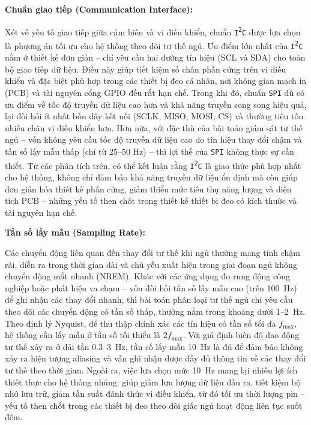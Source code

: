 \textbf{Chuẩn giao tiếp (Communication Interface):}

Xét về yếu tố giao tiếp giữa cảm biến và vi điều khiển, chuẩn \texttt{I\textsuperscript{2}C} được lựa chọn là phương án tối ưu cho hệ thống theo dõi tư thế ngủ. Ưu điểm lớn nhất của \texttt{I\textsuperscript{2}C} nằm ở thiết kế đơn giản – chỉ yêu cầu hai đường tín hiệu (SCL và SDA) cho toàn bộ giao tiếp dữ liệu. Điều này giúp tiết kiệm số chân phần cứng trên vi điều khiển và đặc biệt phù hợp trong các thiết bị đeo cá nhân, nơi không gian mạch in (PCB) và tài nguyên cổng GPIO đều rất hạn chế.
Trong khi đó, chuẩn \texttt{SPI} dù có ưu điểm về tốc độ truyền dữ liệu cao hơn và khả năng truyền song song hiệu quả, lại đòi hỏi ít nhất bốn dây kết nối (SCLK, MISO, MOSI, CS) và thường tiêu tốn nhiều chân vi điều khiển hơn. Hơn nữa, với đặc thù của bài toán giám sát tư thế ngủ – vốn không yêu cầu tốc độ truyền dữ liệu cao do tín hiệu thay đổi chậm và tần số lấy mẫu thấp (chỉ từ 25–50 Hz) – thì lợi thế của \texttt{SPI} không thực sự cần thiết.
Từ các phân tích trên, có thể kết luận rằng \texttt{I\textsuperscript{2}C} là giao thức phù hợp nhất cho hệ thống, không chỉ đảm bảo khả năng truyền dữ liệu ổn định mà còn giúp đơn giản hóa thiết kế phần cứng, giảm thiểu mức tiêu thụ năng lượng và diện tích PCB – những yếu tố then chốt trong thiết kế thiết bị đeo có kích thước và tài nguyên hạn chế.

\textbf{Tần số lấy mẫu (Sampling Rate):}

Các chuyển động liên quan đến thay đổi tư thế khi ngủ thường mang tính chậm rãi, diễn ra trong thời gian dài và chủ yếu xuất hiện trong giai đoạn ngủ không chuyển động mắt nhanh (NREM). Khác với các ứng dụng đo rung động công nghiệp hoặc phát hiện va chạm – vốn đòi hỏi tần số lấy mẫu cao (trên 100~Hz) để ghi nhận các thay đổi nhanh, thì bài toán phân loại tư thế ngủ chỉ yêu cầu theo dõi các chuyển động có tần số thấp, thường nằm trong khoảng dưới 1–2~Hz.
Theo định lý Nyquist, để thu thập chính xác các tín hiệu có tần số tối đa $f_\mathrm{max}$, hệ thống cần lấy mẫu ở tần số tối thiểu là $2f_\mathrm{max}$. Với giả định biên độ dao động tư thế xảy ra ở dải tần 0.3–3~Hz, tần số lấy mẫu 10~Hz là đủ để đảm bảo không xảy ra hiện tượng aliasing và vẫn ghi nhận được đầy đủ thông tin về các thay đổi tư thế theo thời gian.
Ngoài ra, việc lựa chọn mức 10~Hz mang lại nhiều lợi ích thiết thực cho hệ thống nhúng: giúp giảm lưu lượng dữ liệu đầu ra, tiết kiệm bộ nhớ lưu trữ, giảm tần suất đánh thức vi điều khiển, từ đó tối ưu thời lượng pin – yếu tố then chốt trong các thiết bị đeo theo dõi giấc ngủ hoạt động liên tục suốt đêm. 

